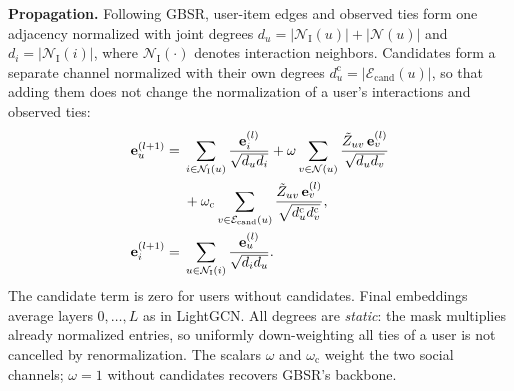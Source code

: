 \documentclass[sigconf]{acmart}
\begin{document}
\textbf{Propagation.} Following GBSR, user-item edges and observed ties form one adjacency normalized with joint degrees $d_u = |\mathcal{N}_{\text{I}}(u)| + |\mathcal{N}(u)|$ and $d_i = |\mathcal{N}_{\text{I}}(i)|$, where $\mathcal{N}_{\text{I}}(\cdot)$ denotes interaction neighbors. Candidates form a separate channel normalized with their own degrees $d^{\text{c}}_u = |\mathcal{E}_{\text{cand}}(u)|$, so that adding them does not change the normalization of a user's interactions and observed ties:
\begin{align}
    \mathbf{e}_u^{(l+1)} = {} & \sum_{i \in \mathcal{N}_{\text{I}}(u)} \frac{\mathbf{e}_i^{(l)}}{\sqrt{d_u d_i}} + \omega \sum_{v \in \mathcal{N}(u)} \frac{\tilde{Z}_{uv}\, \mathbf{e}_v^{(l)}}{\sqrt{d_u d_v}} \notag \\
    & + \omega_{\text{c}} \sum_{v \in \mathcal{E}_{\text{cand}}(u)} \frac{\tilde{Z}_{uv}\, \mathbf{e}_v^{(l)}}{\sqrt{d^{\text{c}}_u d^{\text{c}}_v}}, \label{eq:lgcn_u} \\
    \mathbf{e}_i^{(l+1)} = {} & \sum_{u \in \mathcal{N}_{\text{I}}(i)} \frac{\mathbf{e}_u^{(l)}}{\sqrt{d_i d_u}}. \label{eq:lgcn_i}
\end{align}
The candidate term is zero for users without candidates. Final embeddings average layers $0, \dots, L$ as in LightGCN. All degrees are \emph{static}: the mask multiplies already normalized entries, so uniformly down-weighting all ties of a user is not cancelled by renormalization. The scalars $\omega$ and $\omega_{\text{c}}$ weight the two social channels; $\omega = 1$ without candidates recovers GBSR's backbone.
\end{document}

